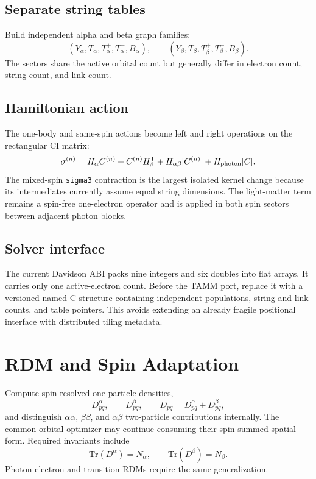 \documentclass[11pt]{article}
\newcommand{\code}[1]{\texttt{\small #1}}
\begin{document}
\subsection{Separate string tables}

Build independent alpha and beta graph families:
\[
(Y_\alpha,T_\alpha,T_\alpha^{+},T_\alpha^{-},B_\alpha),\qquad
(Y_\beta,T_\beta,T_\beta^{+},T_\beta^{-},B_\beta).
\]
The sectors share the active orbital count but generally differ in electron
count, string count, and link count.

\subsection{Hamiltonian action}

The one-body and same-spin actions become left and right operations on the
rectangular CI matrix:
\[
\sigma^{(n)}=H_\alpha C^{(n)}+C^{(n)}H_\beta^{\mathsf T}
+H_{\alpha\beta}[C^{(n)}]+H_{\rm photon}[C].
\]
The mixed-spin \code{sigma3} contraction is the largest isolated kernel change
because its intermediates currently assume equal string dimensions. The
light-matter term remains a spin-free one-electron operator and is applied in
both spin sectors between adjacent photon blocks.

\subsection{Solver interface}

The current Davidson ABI packs nine integers and six doubles into flat arrays.
It carries only one active-electron count. Before the TAMM port, replace it with
a versioned named C structure containing independent populations, string and
link counts, and table pointers. This avoids extending an already fragile
positional interface with distributed tiling metadata.

\section{RDM and Spin Adaptation}

Compute spin-resolved one-particle densities,
\[
D^\alpha_{pq},\qquad D^\beta_{pq},\qquad
D_{pq}=D^\alpha_{pq}+D^\beta_{pq},
\]
and distinguish \(\alpha\alpha\), \(\beta\beta\), and \(\alpha\beta\)
two-particle contributions internally. The common-orbital optimizer may
continue consuming their spin-summed spatial form. Required invariants include
\[
\mathrm{Tr}(D^\alpha)=N_\alpha,\qquad
\mathrm{Tr}(D^\beta)=N_\beta.
\]
Photon-electron and transition RDMs require the same generalization.
\end{document}
